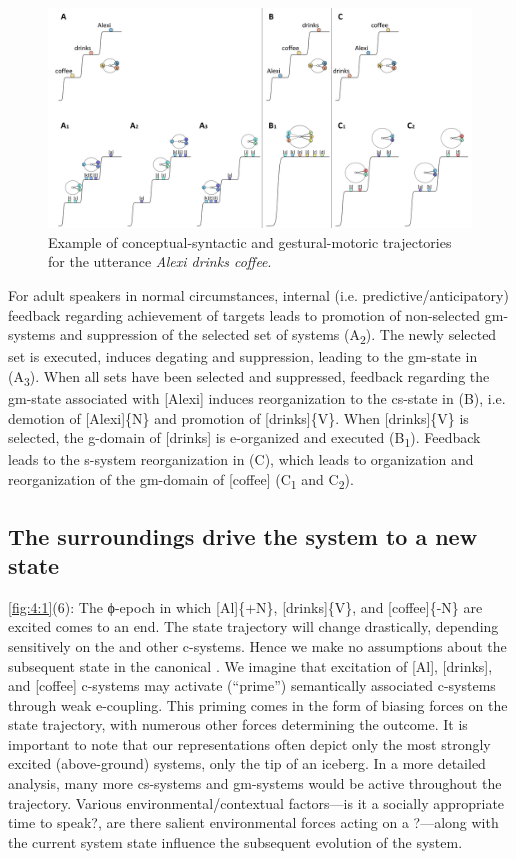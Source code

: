   
\begin{figure}
\includegraphics[width=\textwidth]{figures/Tilsen-img55.png}
\caption{Example of conceptual-syntactic and gestural-motoric trajectories for the utterance \textit{Alexi drinks coffee}.}
\label{fig:4:5}
\end{figure}
 

  For adult speakers in normal circumstances, internal (i.e. predictive/anticipatory) feedback regarding achievement of  targets leads to promotion of non-selected gm-systems and suppression of the selected set of systems (A\textsubscript{2}). The newly selected set is executed,  induces degating and suppression, leading to the gm-state in (A\textsubscript{3}). When all sets have been selected and suppressed, feedback regarding the gm-state associated with [Alexi] induces reorganization to the cs-state in (B), i.e. demotion of [Alexi]\{N\} and promotion of [drinks]\{V\}. When [drinks]\{V\} is selected, the g-domain of [drinks] is e-organized and executed (B\textsubscript{1}). Feedback leads to the s-system reorganization in (C), which leads to organization and reorganization of the gm-domain of [coffee] (C\textsubscript{1} and C\textsubscript{2}).

\subsection{The surroundings drive the system to a new state}

\ref{fig:4:1}(6): The ϕ-epoch in which [Al]\{+N\}, [drinks]\{V\}, and [coffee]\{-N\} are excited comes to an end. The state trajectory will change drastically, depending sensitively on the  and other c-systems. Hence we make no assumptions about the subsequent state in the canonical . We imagine that excitation of [Al], [drinks], and [coffee] c-systems may activate (“prime”) semantically associated c-systems through weak e-coupling. This priming comes in the form of biasing forces on the state trajectory, with numerous other  forces determining the outcome. It is important to note that our representations often depict only the most strongly excited (above-ground) systems, only the tip of an iceberg. In a more detailed analysis, many more cs-systems and gm-systems would be active throughout the trajectory. Various environmental/contextual factors—is it a socially appropriate time to speak?, are there salient environmental forces acting on a ?—along with the current system state influence the subsequent evolution of the system. 

